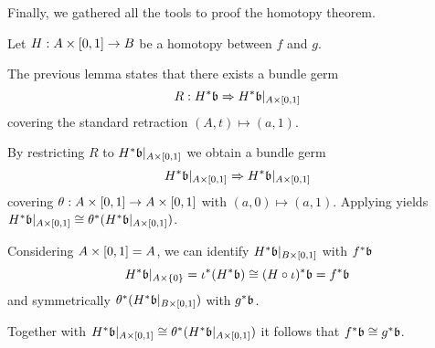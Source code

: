 \begin{myparagraph}
    Finally, we gathered all the tools to proof the homotopy theorem.
\end{myparagraph}

\begin{myproof}
    Let $H: A \times{} [0, 1] \to B$ be a homotopy between $f$ and $g$.

    The previous lemma states that there exists a bundle germ
    \[ R: H^*\mathfrak{b} \Rightarrow{} H^*\mathfrak{b}\vert_{A \times{} [0, 1]} \]
    covering the standard retraction $(A, t) \mapsto (a, 1)$.

    By restricting $R$ to $H^*\mathfrak{b}\vert_{A \times{} [0, 1]}$ we obtain a bundle germ
    \[ H^*\mathfrak{b}\vert_{A \times{} [0, 1]} \Rightarrow{} H^*\mathfrak{b}\vert_{A \times{} [0, 1]} \]
    covering $\theta: A \times{} [0, 1] \to A \times{} [0, 1]$ with $(a, 0) \mapsto (a, 1)$.
    Applying  yields $H^*\mathfrak{b}\vert_{A \times{} [0, 1]} \cong \theta^*(H^*\mathfrak{b}\vert_{A \times{} [0, 1]})$.

    Considering $A \times{} [0, 1] = A$, we can identify $H^*\mathfrak{b}\vert_{B \times{} [0, 1]}$ with $f^*\mathfrak{b}$
    \[ H^*\mathfrak{b}\vert_{A \times \{0\}} = \iota^*(H^*\mathfrak{b}) \cong (H \circ \iota)^*\mathfrak{b} = f^*\mathfrak{b} \]
    and symmetrically $\theta^*(H^*\mathfrak{b}\vert_{B \times{} [0, 1]})$ with $g^*\mathfrak{b}$.

    Together with $H^*\mathfrak{b}\vert_{A \times{} [0, 1]} \cong \theta^*(H^*\mathfrak{b}\vert_{A \times{} [0, 1]})$ it follows that $f^*\mathfrak{b} \cong g^*\mathfrak{b}$.
\end{myproof}